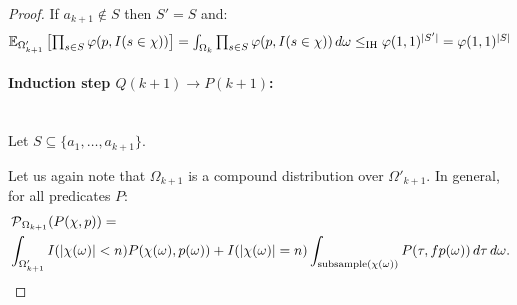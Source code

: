 \begin{proof}
If $a_{k+1} \notin S$ then $S' = S$ and:
\[
  \textstyle \operatorname{\mathbb E}_{\Omega'_{k+1}}\left[\prod_{s \in S} \varphi(p, I(s \in \chi)) \right] =
  \int_{\Omega_k} \prod_{s \in S} \varphi(p, I(s \in \chi)) \, d \omega \leq_{\textrm{IH}} \varphi(1,1)^{|S'|} =
  \varphi(1,1)^{|S|}
\]
\paragraph{Induction step $Q(k+1) \rightarrow P(k+1)$:} \phantom{.}\\
Let $S \subseteq \{ a_1, \ldots, a_{k+1} \}$.

Let us again note that $\Omega_{k+1}$ is a compound distribution over $\Omega'_{k+1}$. In general, for 
all predicates $P$:
\begin{align*}
  & \operatorname{\mathcal P}_{\Omega_{k+1}}( P(\chi, p) ) = \\
  & \int_{\Omega'_{k+1}} I( |\chi(\omega)|<n ) P(\chi(\omega),p(\omega)) +
  I( |\chi(\omega)|=n ) \int_{\mathrm{subsample}(\chi(\omega))}
  P(\tau, f p(\omega)) \, d \tau \, d \omega \textrm{.}
\end{align*}


\end{proof}
